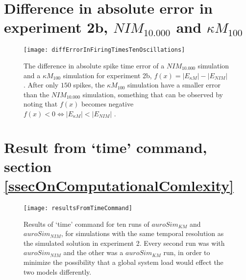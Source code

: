 \newpage
	\section{Difference in absolute error in experiment 2b, $NIM_{10.000}$ and $\kappa M_{100}$}
		\label{appendixDifferenceInError}
		\begin{figure}[hbt!p]
			\centerline{ \texttt{[image: diffErrorInFiringTimesTenOscillations]} }
			\caption[Difference in spike time error for $NIM_{10.000}$ and $\kappa M_{100}$ in an extended run of experiment 2 (ten times as long as the forcing function in experiment 2)]{
				The difference in absolute spike time error of a $NIM_{10.000}$ simulation and a $\kappa M_{100}$ simulation for experiment 2b, $f(x) = |E_{\kappa M}| - |E_{NIM}|$ . 
				After only $150$ spikes, the $\kappa M_{100}$ simulation have a smaller error than the $NIM_{10.000}$ simulation, something that can be observed by noting that $f(x)$ becomes negative \\
					$f(x) < 0 \Leftrightarrow|E_{\kappa M}| < |E_{NIM}|$ .
				}
			\label{appendixDifferenceInErrorFig}
		\end{figure}
\newpage
	\section{Result from `time' command, section \ref{ssecOnComputationalComlexity}}
		\label{appendixOutputOfTimeCommand}
		\begin{figure}[hbt!p]
			\centerline{ \texttt{[image: resultsFromTimeCommand]} }
			\caption[Result of `time' command for ten executions of $auronSim_{KM}$ and $auroSim_{NIM}$]{
				Results of `time' command for ten runs of $auroSim_{KM}$ and $auroSim_{NIM}$, for simulations with the same temporal resolution as the simulated solution in experiment 2.
				Every second run was with $auroSim_{NIM}$ and the other was a $auroSim_{KM}$ run, in order to minimize the possibility that a global system load would effect the two models differently.
				}
		\end{figure}
		


